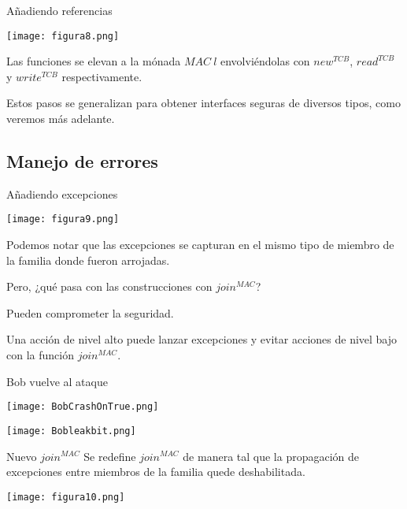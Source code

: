 \documentclass{beamer}
\begin{document}
\begin{frame}{Añadiendo referencias}
    \pause
    \begin{center}
        \texttt{[image: figura8.png]}
    \end{center}

    \pause[3]
    Las funciones se elevan a la mónada $MAC \ l$ envolviéndolas con $new^{TCB}$, $read^{TCB}$ y $write^{TCB}$ respectivamente. 

    \pause[4]
    Estos pasos se generalizan para obtener interfaces seguras de diversos tipos, como veremos más adelante.
\end{frame}

\subsection{Manejo de errores}

\begin{frame}{Añadiendo excepciones}
    \pause
    \begin{center}
        \texttt{[image: figura9.png]}
    \end{center}

    \pause[3]
    Podemos notar que las excepciones se capturan en el mismo tipo de miembro de la familia donde fueron arrojadas.

    \pause[4]
    Pero, ¿qué pasa con las construcciones con $join^{MAC}$?
    
    \pause[5]
    Pueden comprometer la seguridad.

    \pause[6]
    Una acción de nivel alto puede lanzar excepciones y evitar acciones de nivel bajo con la función $join^{MAC}$.
\end{frame}

\begin{frame}{Bob vuelve al ataque}

\pause
    \begin{center}
        \texttt{[image: BobCrashOnTrue.png]}
    \end{center}

    \begin{center}
        \texttt{[image: Bobleakbit.png]}
    \end{center}
\end{frame}

\begin{frame}{Nuevo $join^{MAC}$}
    \pause
    Se redefine $join^{MAC}$ de manera tal que la propagación de excepciones entre miembros de la familia quede deshabilitada.

    \pause[3]
    \begin{center}
        \texttt{[image: figura10.png]}
    \end{center}
\end{frame}
\end{document}
